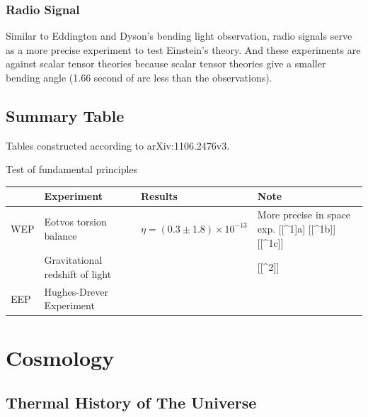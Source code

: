 \documentclass[letterpaper,10pt,english]{sphinxmanual}
\begin{document}
\subsubsection{Radio Signal}
\label{relativity/GeneralRelativityAdv:radio-signal}
Similar to Eddington and Dyson's bending light observation, radio
signals serve as a more precise experiment to test Einstein's theory.
And these experiments are against scalar tensor theories because scalar
tensor theories give a smaller bending angle (1.66 second of arc less
than the observations).


\subsection{Summary Table}
\label{relativity/GeneralRelativityAdv:summary-table}
Tables constructed according to arXiv:1106.2476v3.

Test of fundamental principles

\begin{tabulary}{\linewidth}{|L|L|L|L|}
\hline
\textsf{\relax } & \textsf{\relax 
Experiment
} & \textsf{\relax 
Results
} & \textsf{\relax 
Note
}\\
\hline
WEP
 & 
Eotvos torsion balance
 & 
$\eta = (0.3 \pm 1.8) \times 10^{-13}$
 & 
More precise in space exp. {[}{[}\textasciicircum{}1{]}a{]} {[}{[}\textasciicircum{}1b{]}{]} {[}{[}\textasciicircum{}1c{]}{]}
\\
 & 
Gravitational redshift of light
 &  & 
{[}{[}\textasciicircum{}2{]}{]}
\\

EEP
 & 
Hughes-Drever Experiment
 &  & \\
\hline\end{tabulary}



\section{Cosmology}
\label{Cosmology/cosmoIndex::doc}\label{Cosmology/cosmoIndex:cosmology}

\subsection{Thermal History of The Universe}
\label{Cosmology/cosmoIndex:thermal-history-of-the-universe}
\end{document}
